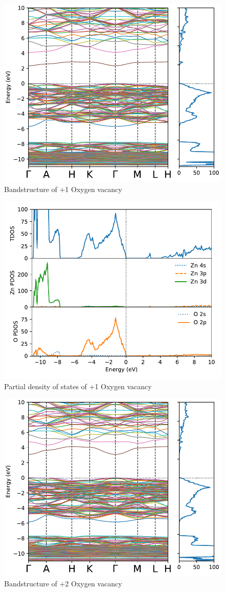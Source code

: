 \begin{figure}[tbh!]
	\centering
	\includegraphics[width=0.6\linewidth]{"images/rnd/band-dos_O_vac-p1"}
	\caption[Bandstructure of +1 Oxygen vacancy]{Bandstructure of +1 Oxygen vacancy}
	\label{fig:band-dos_O_vac-p1}
\end{figure}

\begin{figure}[tbh!]
	\centering
	\includegraphics[width=0.6\linewidth]{"images/rnd/dos-pdos_O_vac-p1"}
	\caption[Partial density of states of +1 Oxygen vacancy]{Partial density of states of +1 Oxygen vacancy}
	\label{fig:dos-pdos_O_vac-p1}
\end{figure}

\begin{figure}[tbh!]
	\centering
	\includegraphics[width=0.6\linewidth]{"images/rnd/band-dos_O_vac-p2"}
	\caption[Bandstructure of +2 Oxygen vacancy]{Bandstructure of +2 Oxygen vacancy}
	\label{fig:band-dos_O_vac-p2}
\end{figure}

